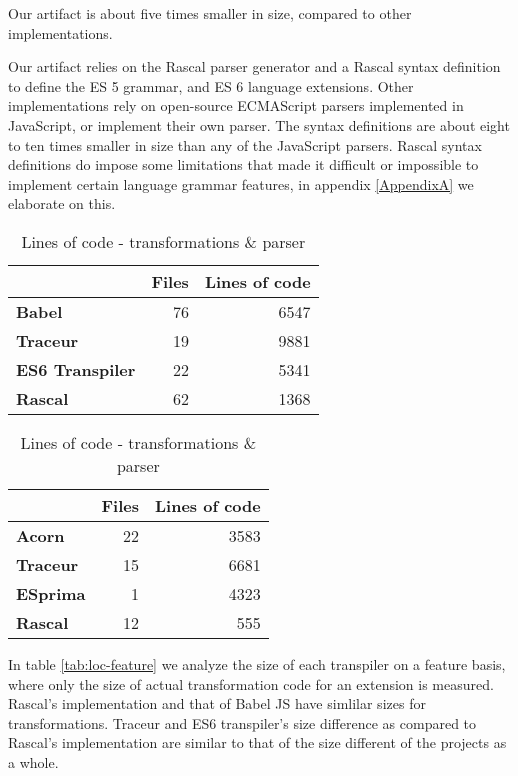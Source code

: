 Our artifact is about five times smaller in size, compared to other implementations. 

Our artifact relies on the Rascal parser generator and a Rascal syntax definition to define the ES 5 grammar, and ES 6 language extensions. Other implementations rely on open-source ECMAScript parsers implemented in JavaScript, or implement their own parser. The syntax definitions are about eight to ten times smaller in size than any of the JavaScript parsers. Rascal syntax definitions do impose some limitations that made it difficult or impossible to implement certain language grammar features, in appendix \ref{AppendixA} we elaborate on this.

\begin{table}[h]
\caption{Lines of code - transformations \& parser} \label{tab:loc}
\begin{minipage}{0.45\linewidth}
\begin{tabular}{@{}lrr@{}}
\toprule
              & {\bf Files} & \multicolumn{1}{l}{{\bf Lines of code}} \\ \midrule
{\bf Babel}   & 76          & 6547                                    \\
{\bf Traceur} & 19          & 9881                                    \\
{\bf ES6 Transpiler} & 22    & 5341
\\
{\bf Rascal}  & 62          & 1368                                    \\ \bottomrule
\end{tabular}
\end{minipage}
\hfill
\begin{minipage}{0.45\linewidth}
\begin{tabular}{@{}lrr@{}}
\toprule
              & {\bf Files} & \multicolumn{1}{l}{{\bf Lines of code}} \\ \midrule
{\bf Acorn}   & 22          & 3583                                    \\
{\bf Traceur} & 15          & 6681                                    \\
{\bf ESprima} & 1           & 4323
\\
{\bf Rascal}  & 12          & 555                                    \\ \bottomrule
\end{tabular}
\end{minipage}
\end{table}

In table \ref{tab:loc-feature} we analyze the size of each transpiler on a feature basis, where only the size of actual transformation code for an extension is measured. Rascal's implementation and that of Babel JS have simlilar sizes for transformations. Traceur and ES6 transpiler's size difference as compared to Rascal's implementation are similar to that of the size different of the projects as a whole. 

